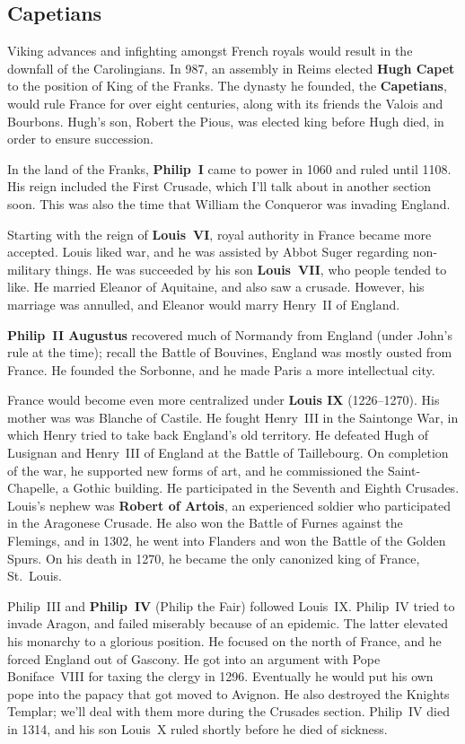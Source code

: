 \subsection*{Capetians}

Viking advances and infighting amongst French royals would result in the downfall of the Carolingians.
In 987, an assembly in Reims elected \textbf{Hugh Capet} to the position of King of the Franks.
The dynasty he founded, the \textbf{Capetians}, would rule France for over eight centuries,
along with its friends the Valois and Bourbons.
Hugh's son, Robert the Pious, was elected king before Hugh died, in order to ensure succession.

In the land of the Franks, \textbf{Philip~I} came to power in 1060 and ruled until 1108.
His reign included the First Crusade, which I'll talk about in another section soon.
This was also the time that William the Conqueror was invading England.

Starting with the reign of \textbf{Louis~VI}, royal authority in France became more accepted.
Louis liked war, and he was assisted by Abbot Suger regarding non-military things.
He was succeeded by his son \textbf{Louis~VII}, who people tended to like.
He married Eleanor of Aquitaine, and also saw a crusade.
However, his marriage was annulled, and Eleanor would marry Henry~II of England.

\textbf{Philip~II Augustus} recovered much of Normandy from England (under John's rule at the time);
recall the Battle of Bouvines, England was mostly ousted from France.
He founded the Sorbonne, and he made Paris a more intellectual city.

France would become even more centralized under \textbf{Louis IX} (1226--1270).
His mother was was Blanche of Castile.
He fought Henry~III in the Saintonge War, in which Henry tried to take back England's old territory.
He defeated Hugh of Lusignan and Henry~III of England at the Battle of Taillebourg.
On completion of the war, he supported new forms of art, and he commissioned the Saint-Chapelle, a Gothic building.
He participated in the Seventh and Eighth Crusades.
Louis's nephew was \textbf{Robert of Artois}, an experienced soldier who participated in the Aragonese Crusade.
He also won the Battle of Furnes against the Flemings,
and in 1302, he went into Flanders and won the Battle of the Golden Spurs.
On his death in 1270, he became the only canonized king of France, St.\ Louis.

Philip~III and \textbf{Philip~IV} (Philip the Fair) followed Louis~IX\@.
Philip~IV tried to invade Aragon, and failed miserably because of an epidemic.
The latter elevated his monarchy to a glorious position.
He focused on the north of France, and he forced England out of Gascony.
He got into an argument with Pope Boniface~VIII for taxing the clergy in 1296.
Eventually he would put his own pope into the papacy that got moved to Avignon.
He also destroyed the Knights Templar; we'll deal with them more during the Crusades section.
Philip~IV died in 1314, and his son Louis~X ruled shortly before he died of sickness.

